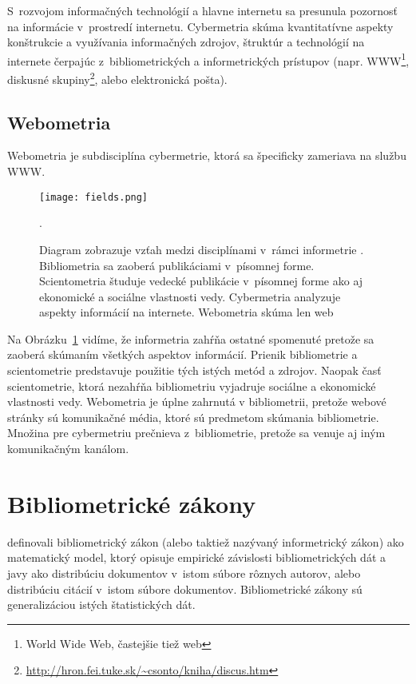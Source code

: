S~rozvojom informačných technológií a hlavne internetu sa presunula pozornosť
na informácie v~prostredí internetu.  Cybermetria skúma kvantitatívne aspekty
konštrukcie a využívania informačných zdrojov, štruktúr a technológií na
internete čerpajúc z~bibliometrických a informetrických prístupov (napr.
WWW\footnote{World Wide Web, častejšie tiež web}, diskusné skupiny\footnote{\url{http://hron.fei.tuke.sk/~csonto/kniha/discus.htm}}, alebo
elektronická pošta).


\subsection{Webometria}

Webometria je subdisciplína cybermetrie, ktorá sa špecificky zameriava na službu WWW.


\begin{figure}
  \centering
  \texttt{[image: fields.png]}
  \caption[Vzťah medzi jednotlivými disciplínami v~rámci informetrie]%
    {Diagram zobrazuje vzťah medzi disciplínami v~rámci informetrie .
    Bibliometria sa zaoberá publikáciami v~písomnej forme.
    Scientometria študuje vedecké publikácie v~písomnej forme ako aj
    ekonomické a sociálne vlastnosti vedy. Cybermetria analyzuje aspekty informácií
    na internete. Webometria skúma len web \citep{Bjorneborn2004}}.
  \label{fig:fields}
\end{figure}



Na Obrázku~\ref{fig:fields} vidíme, že informetria zahŕňa ostatné spomenuté
 pretože sa zaoberá skúmaním všetkých aspektov informácií.  Prienik
bibliometrie a scientometrie predstavuje použitie tých istých metód a zdrojov.
Naopak časť scientometrie, ktorá nezahŕňa bibliometriu vyjadruje sociálne a
ekonomické vlastnosti vedy. Webometria je úplne zahrnutá v bibliometrii,
pretože webové stránky sú komunikačné média, ktoré sú predmetom skúmania
bibliometrie.  Množina pre cybermetriu prečnieva z~bibliometrie, pretože sa
venuje aj iným komunikačným kanálom.

\section{Bibliometrické zákony}

\citet{Todeschini2016} definovali bibliometrický zákon (alebo taktiež nazývaný
informetrický zákon) ako matematický model, ktorý opisuje empirické závislosti
bibliometrických dát a javy ako distribúciu dokumentov v~istom súbore rôznych
autorov, alebo distribúciu citácií v~istom súbore dokumentov.  Bibliometrické
zákony sú generalizáciou istých štatistických dát.

